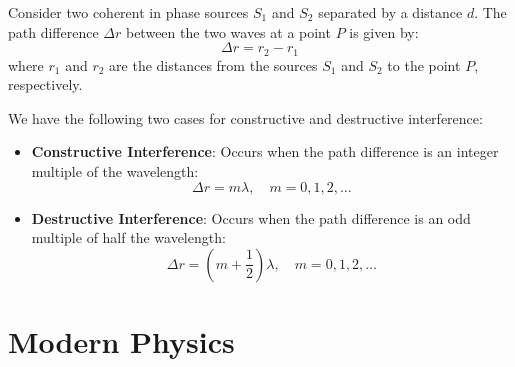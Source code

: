 \documentclass[11pt]{report}
\begin{document}
\begin{definition}[Interference]
    Consider two coherent in phase sources $S_1$ and $S_2$ separated by a distance \( d \). The path difference \( \Delta r \) between the two waves at a point \( P \) is given by:
    \begin{equation}
        \Delta r = r_2 - r_1
    \end{equation}
    where \( r_1 \) and \( r_2 \) are the distances from the sources \( S_1 \) and \( S_2 \) to the point \( P \), respectively.

    We have the following two cases for constructive and destructive interference:
    \begin{itemize}
        \item \textbf{Constructive Interference}: Occurs when the path difference is an integer multiple of the wavelength:
        \begin{equation}
            \Delta r = m \lambda, \quad m = 0, 1, 2, \ldots
        \end{equation}
        \item \textbf{Destructive Interference}: Occurs when the path difference is an odd multiple of half the wavelength:
        \begin{equation}
            \Delta r = \left(m + \frac{1}{2}\right) \lambda, \quad m = 0, 1, 2, \ldots
        \end{equation}
    \end{itemize}
\end{definition}

\chapter{Modern Physics}
\end{document}
